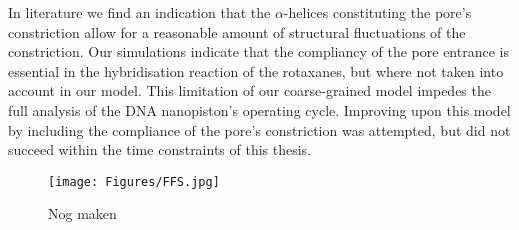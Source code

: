 In literature we find an indication that the $\alpha$-helices constituting the pore's
constriction allow for a reasonable amount of structural fluctuations of the
constriction.\cite{willems2021} Our simulations indicate that the compliancy of the pore
entrance is essential in the hybridisation reaction of the rotaxanes, but where not taken
into account in our model. This limitation of our coarse-grained model impedes the full
analysis of the DNA nanopiston's operating cycle. Improving upon this model by including
the compliance of the pore's constriction was attempted, but did not succeed within the
time constraints of this thesis.

\begin{figure}[ht!]
  \centering
  \texttt{[image: Figures/FFS.jpg]}
  \caption{Nog maken}
\end{figure}

